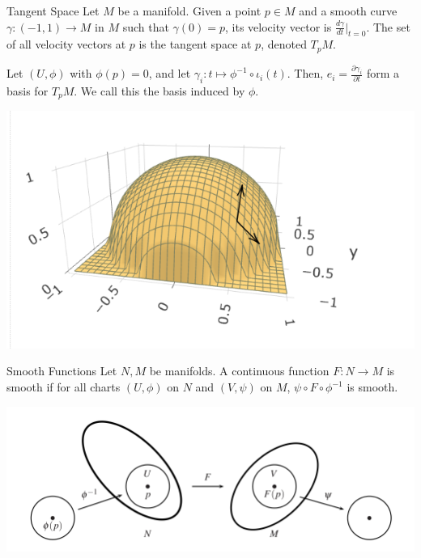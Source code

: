 \documentclass[9pt]{beamer}
\begin{document}
\begin{frame}
    \begin{block}{Tangent Space}
        Let $M$ be a manifold. Given a point $p\in M$ and a smooth curve $\gamma:(-1,1)\rightarrow M$ in $M$ such that $\gamma(0)=p$, its velocity vector is $\frac{d\gamma}{dt}\vert_{t=0}$. The set of all velocity vectors at $p$ is the tangent space at $p$, denoted $T_p M$.
    \end{block}
    Let $(U, \phi)$ with $\phi(p)=0$, and let $\gamma_i:t\mapsto \phi^{-1}\circ\iota_i(t)$. Then, $e_i=\frac{\partial \gamma_i}{\partial t}$ form a basis for $T_pM$. We call this the basis induced by $\phi$.
\begin{center}
    \includegraphics[scale=0.8]{tangent_vectors.png}
\end{center}
\end{frame}

\begin{frame}
    \begin{block}{Smooth Functions}
        Let $N,M$ be manifolds. A continuous function $F:N\rightarrow M$ is smooth if for all charts $(U, \phi)$ on $N$ and $(V, \psi)$ on $M$, $\psi\circ F\circ \phi^{-1}$ is smooth.
    \end{block}
    \includegraphics[scale=0.55]{smooth_function.PNG}
\end{frame}
\end{document}
